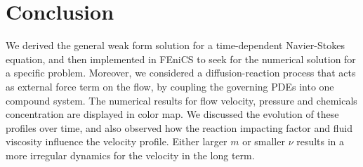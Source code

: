 \section{Conclusion}

We derived the general weak form solution for a time-dependent Navier-Stokes equation, and then implemented in FEniCS to seek for the numerical solution for a specific problem. Moreover, we considered a diffusion-reaction process that acts as external force term on the flow, by coupling the governing PDEs into one compound system. The numerical results for flow velocity, pressure and chemicals concentration are displayed in color map. We discussed the evolution of these profiles over time, and also observed how the reaction impacting factor and fluid viscosity influence the velocity profile. Either larger $m$ or smaller $\nu$ results in a more irregular dynamics for the velocity in the long term.


 